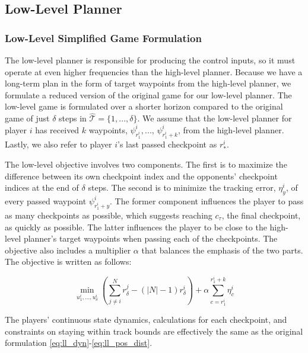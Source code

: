 \subsection{Low-Level Planner}
\subsubsection{Low-Level Simplified Game Formulation}
The low-level planner is responsible for producing the control inputs, so it must operate at even higher frequencies than the high-level planner. Because we have a long-term plan in the form of target waypoints from the high-level planner, we formulate a reduced version of the original game for our low-level planner. The low-level game is formulated over a shorter horizon compared to the original game of just $\delta$ steps in $\hat{\mathcal{T}} = \{1, ..., \delta\}$. We assume that the low-level planner for player $i$ has received $k$ waypoints, $\psi^i_{r^i_{1}}, ..., \, \psi^i_{r^i_{1} + k}$, from the high-level planner. Lastly, we also refer to player $i$'s last passed checkpoint as $r^i_*$. 

The low-level objective involves two components. The first is to maximize the difference between its own checkpoint index and the opponents' checkpoint indices at the end of $\delta$ steps. The second is to minimize the tracking error, $\eta^i_y$, of every passed waypoint $\psi^i_{r^i_{1}+y}$. The former component influences the player to pass as many checkpoints as possible, which suggests reaching $c_\tau$, the final checkpoint, as quickly as possible. The latter influences the player to be close to the high-level planner's target waypoints when passing each of the checkpoints. The objective also includes a multiplier $\alpha$ that balances the emphasis of the two parts. The objective is written as follows:

\begin{equation} \label{eq:ll_obj}
    \min_{u^i_{1}, ..., u^i_{\delta}} (\sum^N_{j \neq i}r^j_{\delta} - (|N|-1) r^i_{\delta}) + \alpha \sum_{c={r^i_{1}}}^{{r^i_{1}}+k} \eta^i_c
\end{equation}

The players' continuous state dynamics, calculations for each checkpoint, and constraints on staying within track bounds  are effectively the same as the original formulation \eqref{eq:ll_dyn}-\eqref{eq:ll_pos_dist}. 

